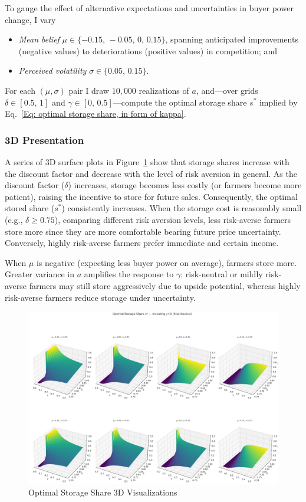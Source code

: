 To gauge the effect of alternative expectations and uncertainties in buyer power change, I vary
\begin{itemize}
    \item \emph{Mean belief} $\mu\in\{-0.15,\,-0.05,\,0,\,0.15\}$, spanning anticipated improvements (negative values) to deteriorations (positive values) in competition; and
    \item \emph{Perceived volatility} $\sigma\in\{0.05,\,0.15\}$.
\end{itemize}
For each $(\mu,\sigma)$ pair I draw $10{,}000$ realizations of $a$, and—over grids $\delta\in[0.5,\,1]$ and $\gamma\in[0,\,0.5]$—compute the optimal storage share $s^{\ast}$ implied by Eq.~\eqref{Eq: optimal storage share, in form of kappa}.


\subsubsection{3D Presentation}
\noindent A series of $3$D surface plots in Figure~\ref{Figure: 3D optimal storage share} show that storage shares increase with the discount factor and decrease with the level of risk aversion in general. As the discount factor ($\delta$) increases, storage becomes less costly (or farmers become more patient), raising the incentive to store for future sales. Consequently, the optimal stored share ($s^*$) consistently increases. When the storage cost is reasonably small (e.g., $\delta \ge 0.75$), comparing different risk aversion levels, less risk-averse farmers store more since they are more comfortable bearing future price uncertainty. Conversely, highly risk-averse farmers prefer immediate and certain income.

When $\mu$ is negative (expecting less buyer power on average), farmers store more. Greater variance in $a$ amplifies the response to $\gamma$: risk-neutral or mildly risk-averse farmers may still store aggressively due to upside potential, whereas highly risk-averse farmers reduce storage under uncertainty.


\begin{figure}[pht]
\centering
\includegraphics[width=\textwidth]{figures/first_p_0.5_s_optimal.png}
\caption{Optimal Storage Share 3D Visualizations}
\label{Figure: 3D optimal storage share}
\end{figure}


